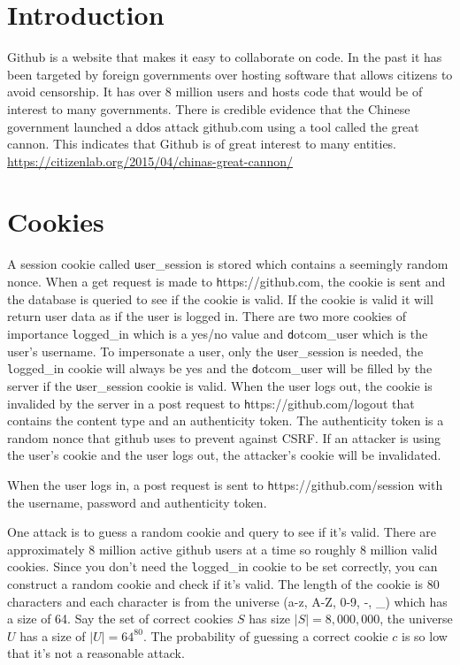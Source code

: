 \documentclass[12pt]{article}
\renewcommand{\tt}[1]{\texttt{#1}}
\begin{document}
\maketitle

\section{Introduction}
Github is a website that makes it easy to collaborate on code. In the past it has been targeted by foreign governments over hosting software that allows citizens to avoid censorship. It has over 8 million users and hosts code that would be of interest to many governments. There is credible evidence that the Chinese government launched a ddos attack github.com using a tool called the great cannon. This indicates that Github is of great interest to many entities. \url{https://citizenlab.org/2015/04/chinas-great-cannon/}

\section{Cookies}\label{cookies}
	A session cookie called {\tt user\_session} is stored which contains a seemingly random nonce. When a get request is made to {\tt https://github.com}, the cookie is sent and the database is queried to see if the cookie is valid. If the cookie is valid it will return user data as if the user is logged in. There are two more cookies of importance {\tt logged\_in} which is a yes/no value and {\tt dotcom\_user} which is the user's username. To impersonate a user, only the {\tt user\_session} is needed, the {\tt logged\_in} cookie will always be yes and the {\tt dotcom\_user} will be filled by the server if the {\tt user\_session} cookie is valid. When the user logs out, the cookie is invalided by the server in a post request to {\tt https://github.com/logout} that contains the content type and an authenticity token. The authenticity token is a random nonce that github uses to prevent against CSRF. If an attacker is using the user's cookie and the user logs out, the attacker's cookie will be invalidated.

When the user logs in, a post request is sent to {\tt https://github.com/session} with the username, password and authenticity token.

One attack is to guess a random cookie and query to see if it's valid. There are approximately 8 million active github users at a time so roughly 8 million valid cookies. Since you don't need the {\tt logged\_in} cookie to be set correctly, you can construct a random cookie and check if it's valid. The length of the cookie is 80 characters and each character is from the universe (a-z, A-Z, 0-9, -, \_) which has a size of 64. Say the set of correct cookies $S$  has size $|S| = 8,000,000$, the universe $U$ has a size of $|U| = 64^{80}$. The probability of guessing a correct cookie $c$ is so low that it's not a reasonable attack.
\end{document}
